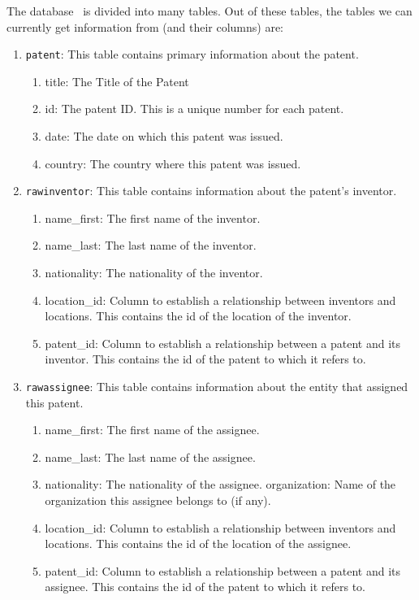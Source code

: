 The database~\cite{patentprocessor} is divided into many tables. Out of these tables, the tables we can currently get information from (and their columns) are:

\begin{enumerate}

\item \verb`patent`: This table contains primary information about the patent. 
\begin{enumerate} 
\item title: The Title of the Patent
\item id: The patent ID. This is a unique number for each patent.
\item date: The date on which this patent was issued. 
\item country: The country where this patent was issued.
\end{enumerate}

\item \verb`rawinventor`: This table contains information about the patent’s inventor.
\begin{enumerate}
\item name\_first: The first name of the inventor.
\item name\_last: The last name of the inventor.
\item nationality: The nationality of the inventor.
\item location\_id: Column to establish a relationship between inventors and locations. This contains the id of the location of the inventor.
\item patent\_id: Column to establish a relationship between a patent and its inventor. This contains the id of the patent to which it refers to.
\end{enumerate}

\item \verb`rawassignee`: This table contains information about the entity that assigned this patent.
\begin{enumerate}
\item name\_first: The first name of the assignee.
\item name\_last: The last name of the assignee.
\item nationality: The nationality of the assignee.
organization: Name of the organization this assignee belongs to (if any).
\item location\_id: Column to establish a relationship between inventors and locations. This contains the id of the location of the assignee.
\item patent\_id: Column to establish a relationship between a patent and its assignee. This contains the id of the patent to which it refers to.
\end{enumerate}


\end{enumerate}

